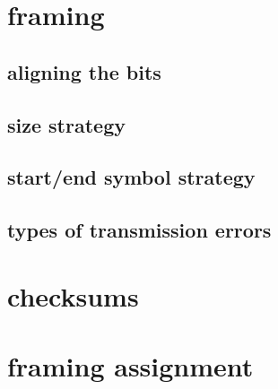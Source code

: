 
\section{framing}

\subsection{aligning the bits}



\subsection{size strategy}



\subsection{start/end symbol strategy}



\subsection{types of transmission errors}



\section{checksums}


\section{framing assignment}

